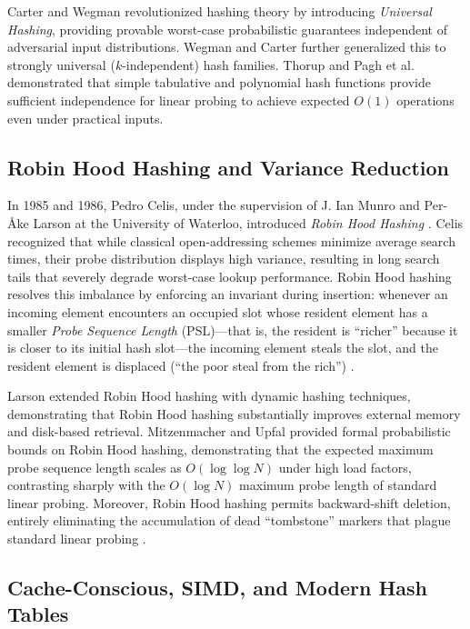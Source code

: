 \documentclass[conference]{IEEEtran}
\begin{document}
Carter and Wegman \cite{carter1979} revolutionized hashing theory by introducing \emph{Universal Hashing}, providing provable worst-case probabilistic guarantees independent of adversarial input distributions. Wegman and Carter \cite{wegman1981} further generalized this to strongly universal ($k$-independent) hash families. Thorup \cite{thorup2015} and Pagh et al. \cite{paghsiam2009} demonstrated that simple tabulative and polynomial hash functions provide sufficient independence for linear probing to achieve expected $O(1)$ operations even under practical inputs.

\subsection{Robin Hood Hashing and Variance Reduction}

In 1985 and 1986, Pedro Celis, under the supervision of J. Ian Munro and Per-\AA ke Larson at the University of Waterloo, introduced \emph{Robin Hood Hashing} \cite{celis1985, celis1986}. Celis recognized that while classical open-addressing schemes minimize average search times, their probe distribution displays high variance, resulting in long search tails that severely degrade worst-case lookup performance. Robin Hood hashing resolves this imbalance by enforcing an invariant during insertion: whenever an incoming element encounters an occupied slot whose resident element has a smaller \emph{Probe Sequence Length} (PSL)---that is, the resident is ``richer'' because it is closer to its initial hash slot---the incoming element steals the slot, and the resident element is displaced (``the poor steal from the rich'') \cite{celis1986}.

Larson \cite{larson1988} extended Robin Hood hashing with dynamic hashing techniques, demonstrating that Robin Hood hashing substantially improves external memory and disk-based retrieval. Mitzenmacher and Upfal \cite{mitzenmacher2017} provided formal probabilistic bounds on Robin Hood hashing, demonstrating that the expected maximum probe sequence length scales as $O(\log \log N)$ under high load factors, contrasting sharply with the $O(\log N)$ maximum probe length of standard linear probing. Moreover, Robin Hood hashing permits backward-shift deletion, entirely eliminating the accumulation of dead ``tombstone'' markers that plague standard linear probing \cite{celis1986}.

\subsection{Cache-Conscious, SIMD, and Modern Hash Tables}
\end{document}
